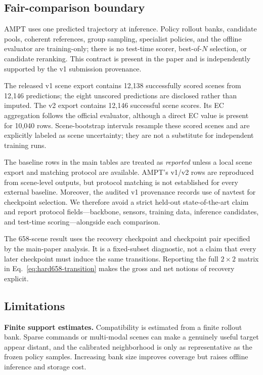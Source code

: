 \subsection{Fair-comparison boundary}
\label{sec:fair-comparison}

AMPT uses one predicted trajectory at inference.  Policy rollout banks,
candidate pools, coherent references, group sampling, specialist policies, and
the offline evaluator are training-only; there is no test-time scorer,
best-of-$N$ selection, or candidate reranking.  This contract is present in the
paper and is independently supported by the v1 submission provenance.

The released v1 scene export contains 12,138 successfully scored scenes from
12,146 predictions; the eight unscored predictions are disclosed rather than
imputed.  The v2 export contains 12,146 successful scene scores.  Its EC
aggregation follows the official evaluator, although a direct EC value is
present for 10,040 rows.  Scene-bootstrap intervals resample these scored
scenes and are explicitly labeled as scene uncertainty; they are not a
substitute for independent training runs.

The baseline rows in the main tables are treated as \emph{reported} unless a
local scene export and matching protocol are available.  AMPT's v1/v2 rows are
reproduced from scene-level outputs, but protocol matching is not established
for every external baseline.  Moreover, the audited v1 provenance records use
of navtest for checkpoint selection.  We therefore avoid a strict held-out
state-of-the-art claim and report protocol fields---backbone, sensors, training
data, inference candidates, and test-time scoring---alongside each comparison.

The 658-scene result uses the recovery checkpoint and checkpoint pair specified
by the main-paper analysis.  It is a fixed-subset diagnostic, not a claim that
every later checkpoint must induce the same transitions.  Reporting the full
$2\times2$ matrix in Eq.~\ref{eq:hard658-transition} makes the gross and net
notions of recovery explicit.

\subsection{Limitations}
\label{sec:limitations}

\textbf{Finite support estimates.}
Compatibility is estimated from a finite rollout bank.  Sparse commands or
multi-modal scenes can make a genuinely useful target appear distant, and the
calibrated neighborhood is only as representative as the frozen policy
samples.  Increasing bank size improves coverage but raises offline inference
and storage cost.


